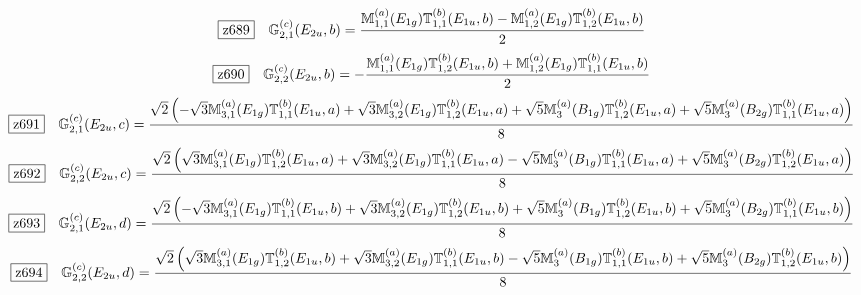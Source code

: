 \documentclass[fleqn,10pt,landscape]{jsarticle}
\begin{document}
\begin{dmath*}
\hspace*{3mm}\fbox{z689}\quad \mathbb{G}_{2,1}^{(c)}(E_{2u},b)=\frac{\mathbb{M}_{1,1}^{(a)}(E_{1g}) \mathbb{T}_{1,1}^{(b)}(E_{1u},b) - \mathbb{M}_{1,2}^{(a)}(E_{1g}) \mathbb{T}_{1,2}^{(b)}(E_{1u},b)}{2}
\end{dmath*}
\begin{dmath*}
\hspace*{3mm}\fbox{z690}\quad \mathbb{G}_{2,2}^{(c)}(E_{2u},b)=- \frac{\mathbb{M}_{1,1}^{(a)}(E_{1g}) \mathbb{T}_{1,2}^{(b)}(E_{1u},b) + \mathbb{M}_{1,2}^{(a)}(E_{1g}) \mathbb{T}_{1,1}^{(b)}(E_{1u},b)}{2}
\end{dmath*}
\begin{dmath*}
\hspace*{3mm}\fbox{z691}\quad \mathbb{G}_{2,1}^{(c)}(E_{2u},c)=\frac{\sqrt{2} \left(- \sqrt{3} \mathbb{M}_{3,1}^{(a)}(E_{1g}) \mathbb{T}_{1,1}^{(b)}(E_{1u},a) + \sqrt{3} \mathbb{M}_{3,2}^{(a)}(E_{1g}) \mathbb{T}_{1,2}^{(b)}(E_{1u},a) + \sqrt{5} \mathbb{M}_{3}^{(a)}(B_{1g}) \mathbb{T}_{1,2}^{(b)}(E_{1u},a) + \sqrt{5} \mathbb{M}_{3}^{(a)}(B_{2g}) \mathbb{T}_{1,1}^{(b)}(E_{1u},a)\right)}{8}
\end{dmath*}
\begin{dmath*}
\hspace*{3mm}\fbox{z692}\quad \mathbb{G}_{2,2}^{(c)}(E_{2u},c)=\frac{\sqrt{2} \left(\sqrt{3} \mathbb{M}_{3,1}^{(a)}(E_{1g}) \mathbb{T}_{1,2}^{(b)}(E_{1u},a) + \sqrt{3} \mathbb{M}_{3,2}^{(a)}(E_{1g}) \mathbb{T}_{1,1}^{(b)}(E_{1u},a) - \sqrt{5} \mathbb{M}_{3}^{(a)}(B_{1g}) \mathbb{T}_{1,1}^{(b)}(E_{1u},a) + \sqrt{5} \mathbb{M}_{3}^{(a)}(B_{2g}) \mathbb{T}_{1,2}^{(b)}(E_{1u},a)\right)}{8}
\end{dmath*}
\begin{dmath*}
\hspace*{3mm}\fbox{z693}\quad \mathbb{G}_{2,1}^{(c)}(E_{2u},d)=\frac{\sqrt{2} \left(- \sqrt{3} \mathbb{M}_{3,1}^{(a)}(E_{1g}) \mathbb{T}_{1,1}^{(b)}(E_{1u},b) + \sqrt{3} \mathbb{M}_{3,2}^{(a)}(E_{1g}) \mathbb{T}_{1,2}^{(b)}(E_{1u},b) + \sqrt{5} \mathbb{M}_{3}^{(a)}(B_{1g}) \mathbb{T}_{1,2}^{(b)}(E_{1u},b) + \sqrt{5} \mathbb{M}_{3}^{(a)}(B_{2g}) \mathbb{T}_{1,1}^{(b)}(E_{1u},b)\right)}{8}
\end{dmath*}
\begin{dmath*}
\hspace*{3mm}\fbox{z694}\quad \mathbb{G}_{2,2}^{(c)}(E_{2u},d)=\frac{\sqrt{2} \left(\sqrt{3} \mathbb{M}_{3,1}^{(a)}(E_{1g}) \mathbb{T}_{1,2}^{(b)}(E_{1u},b) + \sqrt{3} \mathbb{M}_{3,2}^{(a)}(E_{1g}) \mathbb{T}_{1,1}^{(b)}(E_{1u},b) - \sqrt{5} \mathbb{M}_{3}^{(a)}(B_{1g}) \mathbb{T}_{1,1}^{(b)}(E_{1u},b) + \sqrt{5} \mathbb{M}_{3}^{(a)}(B_{2g}) \mathbb{T}_{1,2}^{(b)}(E_{1u},b)\right)}{8}
\end{dmath*}
\end{document}
